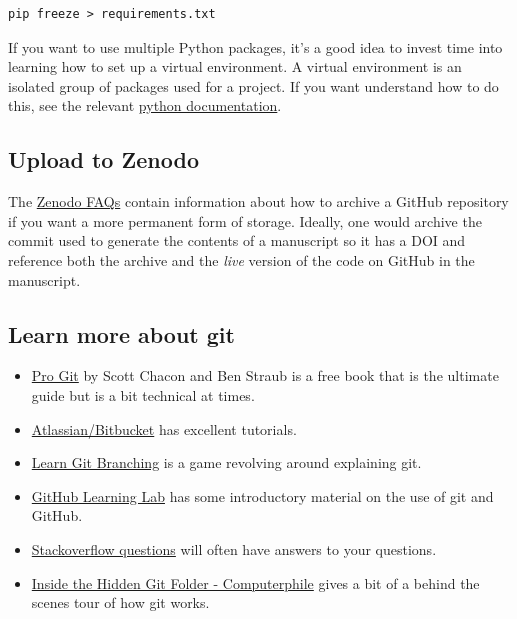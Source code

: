 \documentclass[11pt,onecolumn]{scrartcl}
\begin{document}
\lstset{language=sh,label= ,caption= ,captionpos=b,numbers=none}
\begin{lstlisting}
pip freeze > requirements.txt
\end{lstlisting}

If you want to use multiple Python packages, it's a good idea to invest time
into learning how to set up a virtual environment. A virtual environment is an
isolated group of packages used for a project. If you want understand how to do
this, see the relevant \href{https://docs.python.org/3/tutorial/venv.html}{python documentation}.

\subsection{Upload to Zenodo}
\label{sec:org2602309}

The \href{https://help.zenodo.org/}{Zenodo FAQs} contain information about how to archive a GitHub repository if
you want a more permanent form of storage. Ideally, one would archive the commit
used to generate the contents of a manuscript so it has a DOI and reference both
the archive and the \emph{live} version of the code on GitHub in the manuscript.

\subsection{Learn more about git}
\label{sec:org96fe516}

\begin{itemize}
\item \href{https://git-scm.com/book/en/v2}{Pro Git} by Scott Chacon and Ben Straub is a free book that is the ultimate
guide but is a bit technical at times.
\item \href{https://www.atlassian.com/git/tutorials}{Atlassian/Bitbucket} has excellent tutorials.
\item \href{https://learngitbranching.js.org/}{Learn Git Branching} is a game revolving around explaining git.
\item \href{https://lab.github.com/}{GitHub Learning Lab} has some introductory material on the use of git and
GitHub.
\item \href{https://stackoverflow.com/questions/tagged/git}{Stackoverflow questions} will often have answers to your questions.
\item \href{https://youtu.be/bSA91XTzeuA}{Inside the Hidden Git Folder - Computerphile} gives a bit of a behind the
scenes tour of how git works.
\end{itemize}
\end{document}
